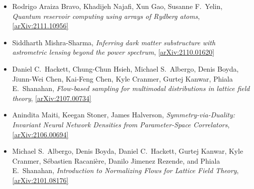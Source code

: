 \begin{itemize}
\item Rodrigo Araiza Bravo, Khadijeh Najafi, Xun Gao, Susanne F.\  Yelin, \textit{Quantum reservoir computing using arrays of Rydberg atoms}, \href{https://arxiv.org/abs/2111.10956}{[arXiv:2111.10956]} 
\item Siddharth Mishra-Sharma, \textit{Inferring dark matter substructure with astrometric lensing beyond the power spectrum}, \href{https://arxiv.org/abs/2110.01620}{[arXiv:2110.01620]} 
\item Daniel C.\  Hackett, Chung-Chun Hsieh, Michael S.\  Albergo, Denis Boyda, Jiunn-Wei Chen, Kai-Feng Chen, Kyle Cranmer, Gurtej Kanwar, Phiala E.\  Shanahan, \textit{Flow-based sampling for multimodal distributions in lattice field theory}, \href{https://arxiv.org/abs/2107.00734}{[arXiv:2107.00734]} 
\item Anindita Maiti, Keegan Stoner, James Halverson, \textit{Symmetry-via-Duality: Invariant Neural Network Densities from Parameter-Space Correlators}, \href{https://arxiv.org/abs/2106.00694}{[arXiv:2106.00694]} 
\item Michael S.\  Albergo, Denis Boyda, Daniel C.\  Hackett, Gurtej Kanwar, Kyle Cranmer, Sébastien Racanière, Danilo Jimenez Rezende, and Phiala E.\  Shanahan, \textit{Introduction to Normalizing Flows for Lattice Field Theory}, \href{https://arxiv.org/abs/2101.08176}{[arXiv:2101.08176]} 
\end{itemize}